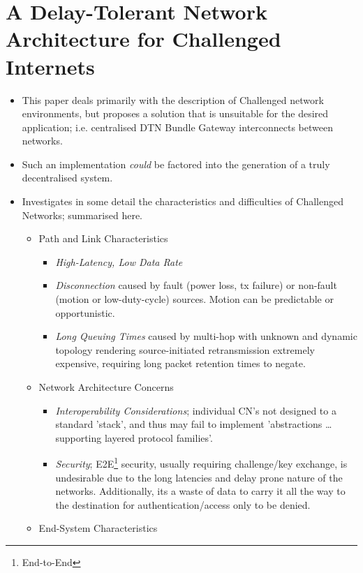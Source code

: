 \section{A Delay-Tolerant Network Architecture for
Challenged Internets \citet*{Fall2003}}
\label{Fall2003_gen}
\begin{itemize}
  \item This paper deals primarily with the description of Challenged
  network environments, but proposes a solution that is unsuitable for the
  desired application; i.e. centralised DTN Bundle Gateway interconnects
  between networks.
  \item Such an implementation \emph{could} be factored into the generation of a
  truly decentralised system.
  \item Investigates in some detail the characteristics and difficulties of
  Challenged Networks; summarised here.
  \begin{itemize}
    \item Path and Link Characteristics
    \begin{itemize}
      \item \emph{High-Latency, Low Data Rate}
      \item \emph{Disconnection} caused by fault (power loss, tx failure) or
      non-fault (motion or low-duty-cycle) sources. Motion can be predictable or
      opportunistic.
      \item \emph{Long Queuing Times} caused by multi-hop with unknown and
      dynamic topology rendering source-initiated retransmission
      extremely expensive, requiring long packet retention times to negate.
	\end{itemize}
    \item Network Architecture Concerns
    \begin{itemize}
      \item \emph{Interoperability Considerations}; individual CN's not designed
      to a standard 'stack', and thus may fail to implement 'abstractions \ldots
      supporting layered protocol families'.
      \item \emph{Security}; E2E\footnote{End-to-End} security, usually requiring challenge/key
      exchange, is undesirable due to the long latencies and delay prone nature
      of the networks. Additionally, its a waste of data to carry it all the way
      to the destination for authentication/access only to be denied.
	\end{itemize}
    \item End-System Characteristics

\end{itemize}
\end{itemize}
